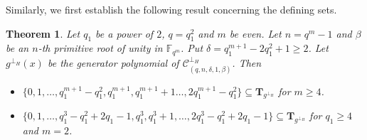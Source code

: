 \documentclass[10pt,a4paper]{amsart}
\newtheorem{theorem}{Theorem}
\begin{document}
Similarly, we first establish the following result concerning the defining sets.

\begin{theorem}
    \label{Hermitian low delta}
    Let $q_1$ be a power of $2$, $q=q_1^2$ and $m$ be even. Let $n=q^m-1$ and $\beta$ be an $n$-th primitive root of unity in $\mathbb{F}_{q^m}$. Put $\delta=q_1^{m+1}-2q_1^2+1\ge 2$. Let $g^{\perp_H}(x)$ be the generator polynomial of $\mathcal{C}_{(q,n,\delta,1,\beta)}^{\perp_H}$. Then
    \begin{itemize}
        \item $\{0,1,\dots,q_1^{m+1}-q_1^2,q_1^{m+1},q_1^{m+1}+1\dots,2q_1^{m+1}-q_1^2\}\subseteq\textbf{T}_{g^{\perp_H}}$ for $m\ge 4$.
        \item $\{0,1,\dots,q_1^3-q_1^2+2q_1-1,q_1^3,q_1^3+1,\dots,2q_1^3-q_1^2+2q_1-1\}\subseteq\textbf{T}_{g^{\perp_H}}$ for $q_1\ge4$ and $m=2$.
    \end{itemize}
\end{theorem}
\end{document}
